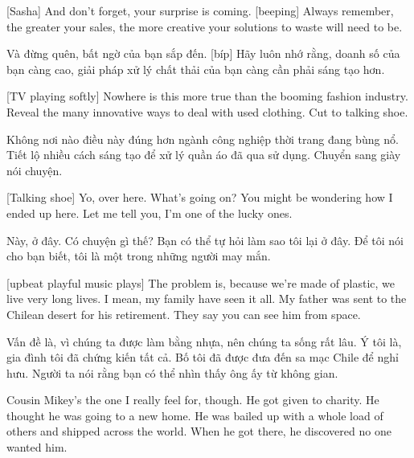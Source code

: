 \documentclass[a4paper]{article}
\begin{document}
	[Sasha] And don't forget, your surprise is coming.
	[beeping]
	Always remember, the greater your sales, the more creative your solutions to waste will need to be.
	
	\begin{vietnamese-v2}
		[Sasha] Và đừng quên, bất ngờ của bạn sắp đến.
		[bíp]
		Hãy luôn nhớ rằng, doanh số của bạn càng cao, giải pháp xử lý chất thải của bạn càng cần phải sáng tạo hơn.
	\end{vietnamese-v2}
	
	[TV playing softly]
	Nowhere is this more true than the booming fashion industry.
	Reveal the many innovative ways to deal with used clothing.
	Cut to talking shoe.
	
	\begin{vietnamese-v2}
		Không nơi nào điều này đúng hơn ngành công nghiệp thời trang đang bùng nổ.
		Tiết lộ nhiều cách sáng tạo để xử lý quần áo đã qua sử dụng.
		Chuyển sang giày nói chuyện.
	\end{vietnamese-v2}
	
	[Talking shoe] Yo, over here.
	What's going on?
	You might be wondering how I ended up here.
	Let me tell you, I'm one of the lucky ones.
	
	\begin{vietnamese-v2}
		 Này, ở đây.
		Có chuyện gì thế?
		Bạn có thể tự hỏi làm sao tôi lại ở đây.
		Để tôi nói cho bạn biết, tôi là một trong những người may mắn.
	\end{vietnamese-v2}
	
	[upbeat playful music plays]
	The problem is, because we're made of plastic, we live very long lives.
	I mean, my family have seen it all.
	My father was sent to the Chilean desert for his retirement.
	They say you can see him from space.
	
	\begin{vietnamese-v2}
		Vấn đề là, vì chúng ta được làm bằng nhựa, nên chúng ta sống rất lâu.
		Ý tôi là, gia đình tôi đã chứng kiến tất cả.
		Bố tôi đã được đưa đến sa mạc Chile để nghỉ hưu.
		Người ta nói rằng bạn có thể nhìn thấy ông ấy từ không gian.
	\end{vietnamese-v2}
	
	Cousin Mikey's the one I really feel for, though.
	He got given to charity.
	He thought he was going to a new home.
	He was bailed up with a whole load of others and shipped across the world.
	When he got there, he discovered no one wanted him.
	
\end{document}
